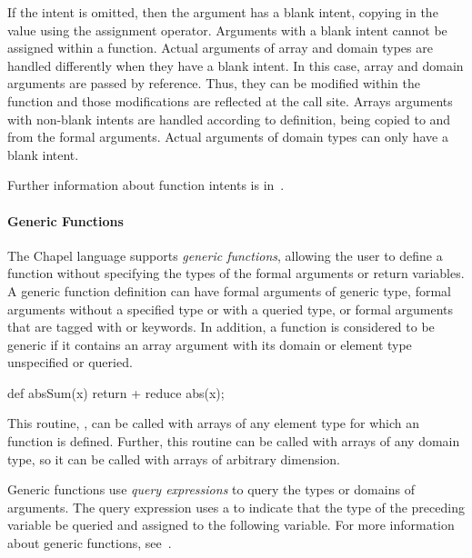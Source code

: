 If the intent is omitted, then the argument has a blank intent,
copying in the value using the assignment operator.  Arguments with a
blank intent cannot be assigned within a function.  Actual arguments
of array and domain types are handled differently when they have a
blank intent.  In this case, array and domain arguments are passed by
reference.  Thus, they can be modified within the function and those
modifications are reflected at the call site.  Arrays arguments with
non-blank intents are handled according to definition, being copied to
and from the formal arguments.  Actual arguments of domain types can
only have a blank intent.

Further information about function intents is in~.

\paragraph{Generic Functions}
The Chapel language supports \emph{generic functions}, allowing the user
to define a function without specifying the types of the formal arguments
or return variables.  A generic function definition can have formal arguments  
of generic type, formal arguments without a specified type or 
with a queried type, or formal arguments that are tagged with 
 or  keywords.  In addition, a function is
considered to be generic if it contains an array argument with its
domain or element type unspecified or queried.

\begin{example}
\begin{chapel}
def absSum(x) {
  return + reduce abs(x); 
}
\end{chapel}
This routine, , can be called
with arrays of any element type for which an  function is
defined.  Further, this routine can be called with arrays of 
any domain type, so it can be called with arrays of arbitrary dimension.
\end{example}

Generic functions use \emph{query expressions} to query the types or
domains of arguments.  The query expression uses a  to
indicate that the type of the preceding variable be queried and
assigned to the following variable.  For more information about
generic functions, see~.

